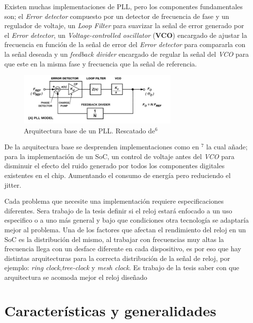 \documentclass[runningheads,a4paper]{llncs}
\begin{document}
    Existen muchas implementaciones de PLL, pero los componentes fundamentales son; el \textit{Error detector} compuesto por un detector de frecuencia de fase y un regulador de voltaje, un \textit{Loop Filter} para suavizar la señal de error generado por el \textit{Error detector}, un \textit{Voltage-controlled oscillator} (\textbf{VCO}) encargado de ajustar la frecuencia en función de la señal de error del \textit{Error detector} para compararla con la señal deseada y un \textit{feedback divider} encargado de regular la señal del \textit{VCO} para que este en la misma fase y frecuencia que la señal de referencia.\\ 

\begin{figure}[t]
\includegraphics[width=8cm]{PLL.png}
\centering
\caption{Arquitectura base de un PLL. Rescatado de${}^6$}
\end{figure}

    De la arquitectura base se desprenden implementaciones como en ${}^7$ la cual añade; para la implementación de un SoC, un control de voltaje antes del \textit{VCO} para disminuir el efecto del ruido generado por todos los componentes digitales existentes en el chip. Aumentando el consumo de energía pero reduciendo el jitter.

    Cada problema que necesite una implementación requiere especificaciones diferentes. Sera trabajo de la tesis definir si el reloj estará enfocado a un uso especifico o a uno más general y bajo que condiciones otra tecnología se adaptaría mejor al problema. Una de los factores que afectan el rendimiento del reloj en un SoC es la distribución del mismo, al trabajar con frecuencias muy altas la frecuencia llega con un desface diferente en cada dispositivo, es por eso que hay distintas arquitecturas para la correcta distribución de la señal de reloj, por ejemplo: \textit{ring clock},\textit{tree-clock} y \textit{mesh clock}. Es trabajo de la tesis saber con que arquitectura se acomoda mejor el reloj diseñado\\


\section{Características y generalidades}
\end{document}
